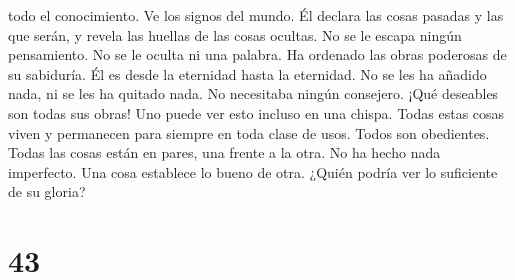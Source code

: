 todo el conocimiento. Ve los signos del mundo.  Él
declara las cosas pasadas y las que serán, y revela las huellas de las
cosas ocultas.  No se le escapa ningún pensamiento. No se
le oculta ni una palabra.  Ha ordenado las obras
poderosas de su sabiduría. Él es desde la eternidad hasta la eternidad.
No se les ha añadido nada, ni se les ha quitado nada. No necesitaba
ningún consejero.  ¡Qué deseables son todas sus obras!
Uno puede ver esto incluso en una chispa.  Todas estas
cosas viven y permanecen para siempre en toda clase de usos. Todos son
obedientes.  Todas las cosas están en pares, una frente a
la otra. No ha hecho nada imperfecto.  Una cosa establece
lo bueno de otra. ¿Quién podría ver lo suficiente de su gloria?

\hypertarget{section-42}{%
\section{43}\label{section-42}}

